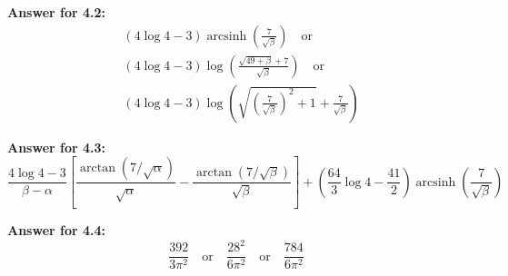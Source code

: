 \documentclass[12pt]{article}
\DeclareMathOperator{\arcsinh}{arcsinh}
\begin{document}
\par \textbf{Answer for 4.2: }
\begin{equation*}
    \begin{split}
        &(4 \log 4 - 3)\arcsinh (\frac{7}{\sqrt{\beta}})\quad \text{or}\\
        &(4 \log 4 - 3)\log (\frac{\sqrt{49+\beta} + 7}{\sqrt{\beta}})\quad \text{or}\\
        &(4 \log 4 - 3)\log(\sqrt{(\frac{7}{\sqrt{\beta}})^2+1} + \frac{7}{\sqrt{\beta}})
    \end{split}
\end{equation*}

\par \textbf{Answer for 4.3: }
\begin{equation*}
    \frac{4\log 4 - 3}{\beta - \alpha}\left[\frac{\arctan(7/\sqrt{\alpha})}{\sqrt{\alpha}} - \frac{\arctan(7/\sqrt{\beta})}{\sqrt{\beta}}\right] 
    + \left(\frac{64}{3}\log 4 - \frac{41}{2}\right)\arcsinh\left(\frac{7}{\sqrt{\beta}}\right)
\end{equation*}

\par \textbf{Answer for 4.4: }
\begin{equation*}
    \frac{392}{3\pi^2} \quad \text{or} \quad \frac{28^2}{6\pi^2} \quad \text{or}\quad \frac{784}{6\pi^2}
\end{equation*}
\end{document}

